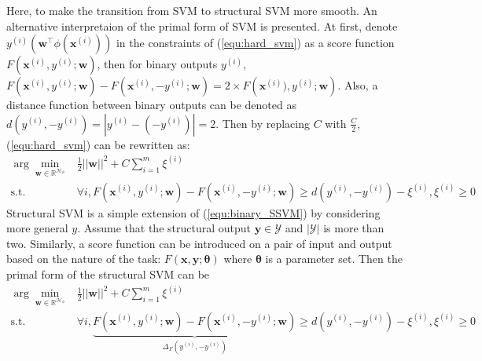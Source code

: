 Here, to make the transition from SVM to structural SVM more smooth. An alternative interpretaion  
of the primal form of SVM is presented. 
At first, denote $y^{(i)} \left(\mathbf{w}^\top \phi (\mathbf{x}^{(i)})\right)$ in the constraints of (\ref{equ:hard_svm}) as a score function $F(\mathbf{x}^{(i)},y^{(i)}; \mathbf{w})$, then  
for binary outputs $y^{(i)}$, $F\left(\mathbf{x}^{(i)},y^{(i)}; \mathbf{w}\right)- F\left(\mathbf{x}^{(i)},-y^{(i)}; \mathbf{w}\right)=2\times F\left(\mathbf{x}^{(i)}),y^{(i)}; \mathbf{w}\right)$. 
Also, a distance function between binary outputs can be denoted as $d(y^{(i)},-y^{(i)})=|y^{(i)}-(-y^{(i)})|=2$. Then by replacing $C$ with $\frac{C}{2}$, (\ref{equ:hard_svm}) can be rewritten 
as:
\begin{equation}
\begin{array}{rl}
\displaystyle \arg\min_{ \mathbf{w} \in \mathbb{R}^{\mathcal{H_{\phi}}}}   & \frac{1}{2} ||\mathbf{w}||^2+C\sum_{i=1}^m \xi^{(i)} \\
                                                                       \text{s.t.} & \forall i, F\left(\mathbf{x}^{(i)},y^{(i)}; \mathbf{w}\right)- F\left(\mathbf{x}^{(i)},-y^{(i)}; \mathbf{w}\right) \geq d(y^{(i)},-y^{(i)})-\xi^{(i)}, \xi^{(i)} \geq 0 
\end{array}
\label{equ:binary_SSVM}
\end{equation}
Structural SVM \citep{StructSVM} is a simple extension of (\ref{equ:binary_SSVM}) by considering more general $y$. 
Assume that the structural output $\mathbf{y}\in\mathcal{Y}$ and $|\mathcal{Y}|$ is more than 
two. Similarly, a score function can be introduced on a pair of input and output based on the 
nature of the task: $F(\mathbf{x},\mathbf{y};\boldsymbol{\theta})$ where $\boldsymbol{\theta}$ is
a parameter set. Then the primal form of the structural SVM can be   
\begin{equation}
\begin{array}{rl}
\displaystyle \arg\min_{ \mathbf{w} \in \mathbb{R}^{\mathcal{H_{\phi}}}}   & \frac{1}{2} ||\mathbf{w}||^2+C\sum_{i=1}^m \xi^{(i)} \\
                                                                       \text{s.t.} & \forall i, \underbrace{F\left(\mathbf{x}^{(i)},y^{(i)}; \mathbf{w}\right)- F\left(\mathbf{x}^{(i)},-y^{(i)}; \mathbf{w}\right)}_{\Delta_F(y^{(i)},-y^{(i)})} \geq d(y^{(i)},-y^{(i)})-\xi^{(i)}, \xi^{(i)} \geq 0 
\end{array}
\label{equ:binary_SSVM}
\end{equation}

